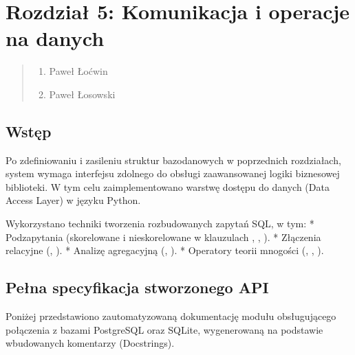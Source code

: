 \documentclass[letterpaper,10pt,english]{sphinxmanual}
\begin{document}
\sphinxstepscope


\chapter{Rozdział 5: Komunikacja i operacje na danych}
\label{\detokenize{rozdzial_5/index:rozdzial-5-komunikacja-i-operacje-na-danych}}\label{\detokenize{rozdzial_5/index::doc}}\begin{quote}\begin{description}
\begin{enumerate}
%
\item {} 
\sphinxAtStartPar
Paweł Łoćwin

\item {} 
\sphinxAtStartPar
Paweł Łosowski

\end{enumerate}

\end{description}\end{quote}


\section{Wstęp}
\label{\detokenize{rozdzial_5/index:wstep}}
\sphinxAtStartPar
Po zdefiniowaniu i zasileniu struktur bazodanowych w poprzednich rozdziałach, system wymaga
interfejsu zdolnego do obsługi zaawansowanej logiki biznesowej biblioteki. W tym celu zaimplementowano
warstwę dostępu do danych (Data Access Layer) w języku Python.

\sphinxAtStartPar
Wykorzystano techniki tworzenia rozbudowanych zapytań SQL, w tym:
* Podzapytania (skorelowane i nieskorelowane w klauzulach , , ).
* Złączenia relacyjne (, ).
* Analizę agregacyjną (, ).
* Operatory teorii mnogości (, , ).


\section{Pełna specyfikacja stworzonego API}
\label{\detokenize{rozdzial_5/index:pelna-specyfikacja-stworzonego-api}}
\sphinxAtStartPar
Poniżej przedstawiono zautomatyzowaną dokumentację modułu obsługującego połączenia z
bazami PostgreSQL oraz SQLite, wygenerowaną na podstawie wbudowanych komentarzy (Docstrings).
\end{document}
